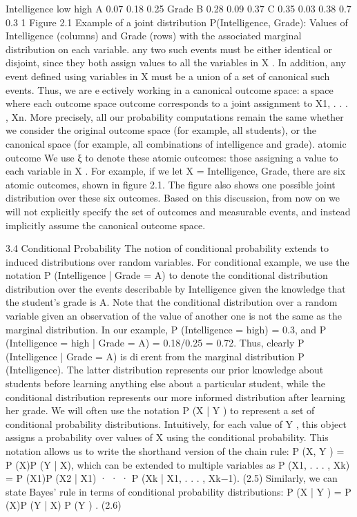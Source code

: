 Intelligence low high A 0.07 0.18 0.25 Grade B 0.28 0.09 0.37 C 0.35 0.03 0.38 0.7 0.3 1 Figure 2.1 Example of a joint distribution P(Intelligence, Grade): Values of Intelligence (columns) and Grade (rows) with the associated marginal distribution on each variable. any two such events must be either identical or disjoint, since they both assign values to all the variables in X . In addition, any event defined using variables in X must be a union of a set of canonical such events. Thus, we are eectively working in a canonical outcome space: a space where each outcome space outcome corresponds to a joint assignment to X1, . . . , Xn. More precisely, all our probability computations remain the same whether we consider the original outcome space (for example, all students), or the canonical space (for example, all combinations of intelligence and grade). atomic outcome We use ξ to denote these atomic outcomes: those assigning a value to each variable in X . For example, if we let X = {Intelligence, Grade}, there are six atomic outcomes, shown in figure 2.1. The figure also shows one possible joint distribution over these six outcomes. Based on this discussion, from now on we will not explicitly specify the set of outcomes and measurable events, and instead implicitly assume the canonical outcome space.

3.4 Conditional Probability
The notion of conditional probability extends to induced distributions over random variables. For conditional example, we use the notation P (Intelligence | Grade = A) to denote the conditional distribution distribution over the events describable by Intelligence given the knowledge that the student’s grade is A. Note that the conditional distribution over a random variable given an observation of the value of another one is not the same as the marginal distribution. In our example, P (Intelligence = high) = 0.3, and P (Intelligence = high | Grade = A) = 0.18/0.25 = 0.72. Thus, clearly P (Intelligence | Grade = A) is dierent from the marginal distribution P (Intelligence). The latter distribution represents our prior knowledge about students before learning anything else about a particular student, while the conditional distribution represents our more informed distribution after learning her grade. We will often use the notation P (X | Y ) to represent a set of conditional probability distributions. Intuitively, for each value of Y , this object assigns a probability over values of X using the conditional probability. This notation allows us to write the shorthand version of the chain rule: P (X, Y ) = P (X)P (Y | X), which can be extended to multiple variables as P (X1, . . . , Xk) = P (X1)P (X2 | X1) · · · P (Xk | X1, . . . , Xk−1). (2.5) Similarly, we can state Bayes’ rule in terms of conditional probability distributions: P (X | Y ) = P (X)P (Y | X) P (Y ) . (2.6)

